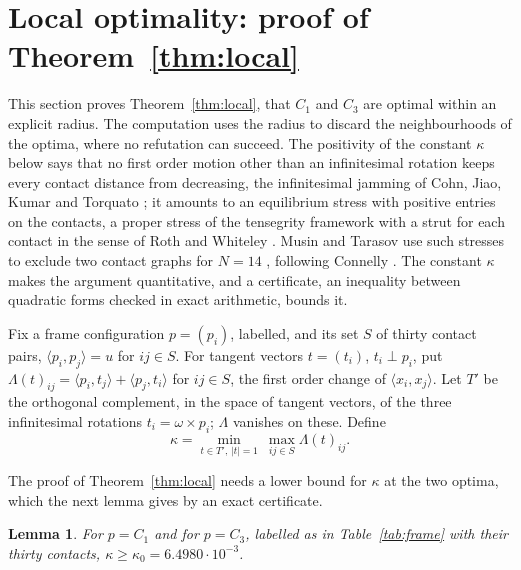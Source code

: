 \documentclass[12pt]{amsart}
\newtheorem{lemma}[theorem]{Lemma}
\theoremstyle{definition}
\theoremstyle{plain}
\theoremstyle{definition}
\newcommand{\CI}{C_1}
\newcommand{\CIII}{C_3}
\newcommand{\leanmap}[1]{\ignorespaces}
\newcommand{\codemap}[1]{\ignorespaces}
\begin{document}
\section{Local optimality: proof of Theorem~\ref{thm:local}}\label{sec:local}

This section proves Theorem~\ref{thm:local}, that $\CI$ and $\CIII$ are optimal within an explicit radius. The computation uses the radius to discard the neighbourhoods of the optima, where no refutation can succeed. The positivity of the constant $\kappa$ below says that no first order motion other than an infinitesimal rotation keeps every contact distance from decreasing, the infinitesimal jamming of Cohn, Jiao, Kumar and Torquato \cite[Section~2]{CJKT}; it amounts to an equilibrium stress with positive entries on the contacts, a proper stress of the tensegrity framework with a strut for each contact in the sense of Roth and Whiteley \cite{RW}. Musin and Tarasov use such stresses to exclude two contact graphs for $N=14$ \cite[Section~4.2]{MT14}, following Connelly \cite{Con}. The constant $\kappa$ makes the argument quantitative, and a certificate, an inequality between quadratic forms checked in exact arithmetic, bounds it.

Fix a frame configuration $p=(p_i)$, labelled, and its set $S$ of thirty contact pairs, $\langle p_i,p_j\rangle=u$ for $ij\in S$. For tangent vectors $t=(t_i)$, $t_i\perp p_i$, put $\Lambda(t)_{ij}=\langle p_i,t_j\rangle+\langle p_j,t_i\rangle$ for $ij\in S$, the first order change of $\langle x_i,x_j\rangle$. Let $T'$ be the orthogonal complement, in the space of tangent vectors, of the three infinitesimal rotations $t_i=\omega\times p_i$; $\Lambda$ vanishes on these. Define
\[
\kappa=\min_{t\in T',\,|t|=1}\ \max_{ij\in S}\Lambda(t)_{ij}.
\]

The proof of Theorem~\ref{thm:local} needs a lower bound for $\kappa$ at the two optima, which the next lemma gives by an exact certificate.

\begin{lemma}\label{lem:kappa}\leanmap{Tammes15.Kappa.kappaHyp, Tammes15.Kappa.kappa_C1, Tammes15.Kappa.kappa_C3}\codemap{code/lean-data/d1_lp.sage > code/lean-data/d1_lp.out, code/lean-data/d1_kernel.sage > code/lean-data/d1_kernel.out, code/lean-data/gen_close.sh > code/lean-data/gen_close.out, code/lean-data/regen.sh > code/lean-data/regen.out}
For $p=\CI$ and for $p=\CIII$, labelled as in Table~\ref{tab:frame} with their thirty contacts, $\kappa\ge\kappa_0=6.4980\cdot10^{-3}$.
\end{lemma}
\end{document}
